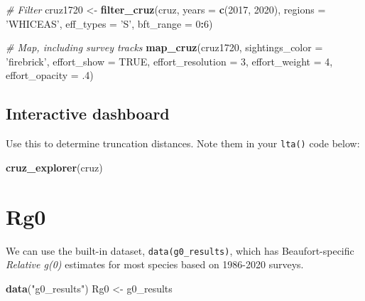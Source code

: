 \documentclass[
]{book}
\newenvironment{Shaded}{\begin{snugshade}}{\end{snugshade}}
\newcommand{\CommentTok}[1]{\textcolor[rgb]{0.56,0.35,0.01}{\textit{#1}}}
\newcommand{\DataTypeTok}[1]{\textcolor[rgb]{0.13,0.29,0.53}{#1}}
\newcommand{\DecValTok}[1]{\textcolor[rgb]{0.00,0.00,0.81}{#1}}
\newcommand{\FloatTok}[1]{\textcolor[rgb]{0.00,0.00,0.81}{#1}}
\newcommand{\KeywordTok}[1]{\textcolor[rgb]{0.13,0.29,0.53}{\textbf{#1}}}
\newcommand{\NormalTok}[1]{#1}
\newcommand{\OperatorTok}[1]{\textcolor[rgb]{0.81,0.36,0.00}{\textbf{#1}}}
\newcommand{\OtherTok}[1]{\textcolor[rgb]{0.56,0.35,0.01}{#1}}
\newcommand{\StringTok}[1]{\textcolor[rgb]{0.31,0.60,0.02}{#1}}
\begin{document}
\begin{Shaded}
\begin{Highlighting}[]
\CommentTok{# Filter}
\NormalTok{cruz1720 <-}\StringTok{ }\KeywordTok{filter_cruz}\NormalTok{(cruz, }
                        \DataTypeTok{years =} \KeywordTok{c}\NormalTok{(}\DecValTok{2017}\NormalTok{, }\DecValTok{2020}\NormalTok{), }
                        \DataTypeTok{regions =} \StringTok{'WHICEAS'}\NormalTok{,}
                        \DataTypeTok{eff_types =} \StringTok{'S'}\NormalTok{,}
                        \DataTypeTok{bft_range =} \DecValTok{0}\OperatorTok{:}\DecValTok{6}\NormalTok{)}

\CommentTok{# Map, including survey tracks}
\KeywordTok{map_cruz}\NormalTok{(cruz1720,}
         \DataTypeTok{sightings_color =} \StringTok{'firebrick'}\NormalTok{, }
         \DataTypeTok{effort_show =} \OtherTok{TRUE}\NormalTok{, }
         \DataTypeTok{effort_resolution =} \DecValTok{3}\NormalTok{,}
         \DataTypeTok{effort_weight =} \DecValTok{4}\NormalTok{,}
         \DataTypeTok{effort_opacity =} \FloatTok{.4}\NormalTok{)}
\end{Highlighting}
\end{Shaded}

\hypertarget{interactive-dashboard-1}{%
\subsection*{Interactive dashboard}\label{interactive-dashboard-1}}

Use this to determine truncation distances. Note them in your \texttt{lta()} code below:

\begin{Shaded}
\begin{Highlighting}[]
\KeywordTok{cruz_explorer}\NormalTok{(cruz)}
\end{Highlighting}
\end{Shaded}

\hypertarget{rg0-1}{%
\section*{Rg0}\label{rg0-1}}

We can use the built-in dataset, \texttt{data(g0\_results)}, which has Beaufort-specific \emph{Relative g(0)} estimates for most species based on 1986-2020 surveys.

\begin{Shaded}
\begin{Highlighting}[]
\KeywordTok{data}\NormalTok{(}\StringTok{"g0_results"}\NormalTok{)}
\NormalTok{Rg0 <-}\StringTok{ }\NormalTok{g0_results}
\end{Highlighting}
\end{Shaded}
\end{document}
